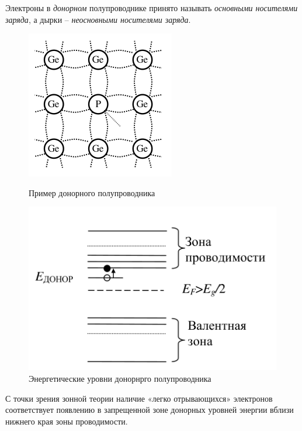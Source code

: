 Электроны в \textit{донорном} полупроводнике принято называть \textit{основными носителями заряда}, а дырки -- \textit{неосновными носителями заряда}.
\begin{figure}[H]
	\begin{minipage}{0.48\textwidth}
		\centering
		\includegraphics[width=0.7\linewidth]{img/oral-04/donor_poluprovodnik}
		\caption{Пример донорного полупроводника}
		\label{fig:donorpoluprovodnik}
	\end{minipage}\hfill
	\begin{minipage}{0.48\textwidth}
		\centering
		\includegraphics[width=\linewidth]{img/oral-04/donor_poluprovodnik1_energy}
		\caption{Энергетические уровни донорнрго полупроводника}
		\label{fig:donorpoluprovodnik1energy}
	\end{minipage}
\end{figure}
С точки зрения зонной теории наличие «легко отрывающихся» электронов соответствует появлению в запрещенной зоне донорных уровней энергии вблизи нижнего края зоны проводимости.

